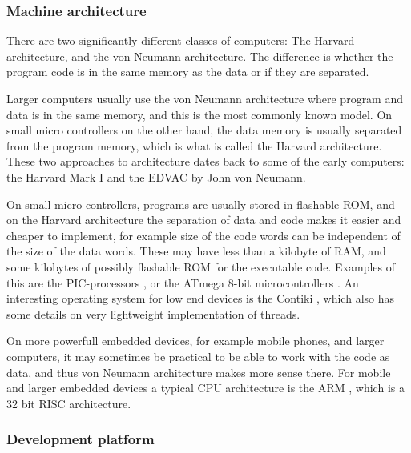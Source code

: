 \documentclass[11pt]{report}
\begin{document}
\subsubsection{Machine architecture}
There are two significantly different classes of computers: The Harvard architecture, and the von Neumann architecture. The difference is whether the program code is in the same memory as the data or if they are separated.

Larger computers usually use the von Neumann architecture where program and data is in the same memory, and this is the most commonly known model.
On small micro controllers on the other hand, the data memory is usually separated from the program memory, which is what is called the Harvard architecture. 
These two approaches to architecture dates back to some of the early computers: the Harvard Mark I \cite{harvard-mark1} and the EDVAC \cite{edvac} by John von Neumann.

On small micro controllers, programs are usually stored in flashable ROM, and on the Harvard architecture the separation of data and code makes it easier and cheaper to implement, for example size of the code words can be independent of the size of the data words.
These may have less than a kilobyte of RAM, and some kilobytes of possibly flashable ROM for the executable code. Examples of this are the PIC-processors \cite{picspec}, or the ATmega 8-bit microcontrollers \cite{atmegaspec}.
An interesting operating system for low end devices is the Contiki \cite{contiki}, which also has some details on very lightweight implementation of threads.

On more powerfull embedded devices, for example mobile phones, and larger computers,
it may sometimes be practical to be able to work with the code as data, and thus von Neumann architecture makes more sense there.
For mobile and larger embedded devices a typical CPU architecture is the ARM \cite{arm-architecture}, which is a 32 bit RISC architecture.

\subsubsection{Development platform}
\end{document}
